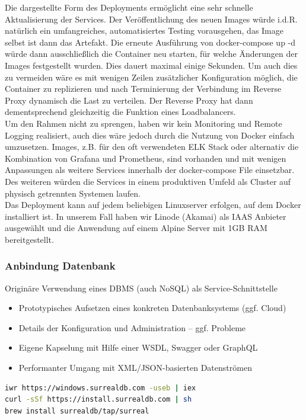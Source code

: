 \documentclass[notitlepage, hidelinks]{article}
\begin{document}
Die dargestellte Form des Deployments ermöglicht eine sehr schnelle Aktualisierung der Services. Der Veröffentlichung des neuen Images würde i.d.R. natürlich ein umfangreiches, automatisiertes Testing vorausgehen, das Image selbst ist dann das Artefakt. Die erneute Ausführung von docker-compose up -d würde dann ausschließlich die Container neu starten, für welche Änderungen der Images festgestellt wurden. Dies dauert maximal einige Sekunden. Um auch dies zu vermeiden wäre es mit wenigen Zeilen zusätzlicher Konfiguration möglich, die Container zu replizieren und nach Terminierung der Verbindung im Reverse Proxy dynamisch die Last zu verteilen. Der Reverse Proxy hat dann dementsprechend gleichzeitig die Funktion eines Loadbalancers. \\
Um den Rahmen nicht zu sprengen, haben wir kein Monitoring und Remote Logging realisiert, auch dies wäre jedoch durch die Nutzung von Docker einfach umzusetzen. Images, z.B. für den oft verwendeten ELK Stack oder alternativ die Kombination von Grafana und Prometheus, sind vorhanden und mit wenigen Anpassungen als weitere Services innerhalb der docker-compose File einsetzbar. Des weiteren würden die Services in einem produktiven Umfeld als Cluster auf physisch getrennten Systemen laufen.\\
Das Deployment kann auf jedem beliebigen Linuxserver erfolgen, auf dem Docker installiert ist. In unserem Fall haben wir Linode (Akamai) als IAAS Anbieter ausgewählt und die Anwendung auf einem Alpine Server mit 1GB RAM bereitgestellt. 


\subsubsection{Anbindung Datenbank} \label{anbindungdatenbank}
Originäre Verwendung eines DBMS (auch NoSQL) als Service-Schnittstelle
\begin{itemize}
\item Prototypisches Aufsetzen eines konkreten Datenbanksystems (ggf. Cloud)
\item Details der Konfiguration und Administration – ggf. Probleme
\item Eigene Kapselung mit Hilfe einer WSDL, Swagger oder GraphQL
\item Performanter Umgang mit XML/JSON-basierten Datenströmen
\end{itemize}


\begin{lstlisting}[language=bash,frame=single,caption=CLI Kommandos zur lokalen Installation der Datenbank für Windows\, Linux und macOS,label=dbinstall]
iwr https://windows.surrealdb.com -useb | iex
curl -sSf https://install.surrealdb.com | sh
brew install surrealdb/tap/surreal
\end{lstlisting}
\end{document}
